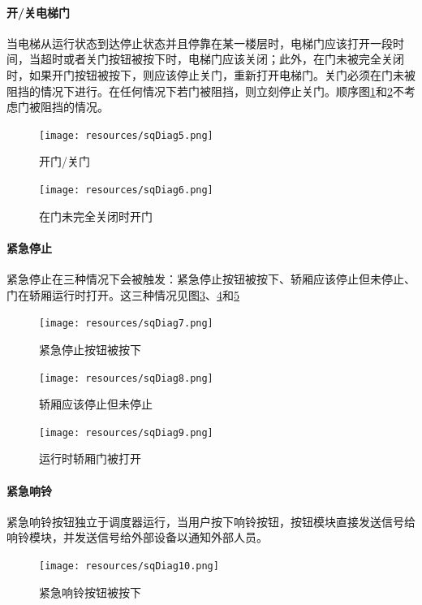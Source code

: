 \begin{minipage}{\textwidth}
\paragraph{开/关电梯门}
当电梯从运行状态到达停止状态并且停靠在某一楼层时，电梯门应该打开一段时间，当超时或者关门按钮被按下时，电梯门应该关闭；此外，在门未被完全关闭时，如果开门按钮被按下，则应该停止关门，重新打开电梯门。关门必须在门未被阻挡的情况下进行。在任何情况下若门被阻挡，则立刻停止关门。顺序图\ref{fig:sqDiag5}和\ref{fig:sqDiag6}不考虑门被阻挡的情况。
\begin{figure}[H]
	\centering
	\texttt{[image: resources/sqDiag5.png]}
	\caption{开门/关门}
	\label{fig:sqDiag5}
\end{figure}

\begin{figure}[H]
	\centering
	\texttt{[image: resources/sqDiag6.png]}
	\caption{在门未完全关闭时开门}
	\label{fig:sqDiag6}
\end{figure}
\end{minipage}

\begin{minipage}{\textwidth}
\paragraph{紧急停止}
紧急停止在三种情况下会被触发：紧急停止按钮被按下、轿厢应该停止但未停止、门在轿厢运行时打开。这三种情况见图\ref{fig:sqDiag7}、\ref{fig:sqDiag8}和\ref{fig:sqDiag9}

\begin{figure}[H]
	\centering
	\texttt{[image: resources/sqDiag7.png]}
	\caption{紧急停止按钮被按下}
	\label{fig:sqDiag7}
\end{figure}

\begin{figure}[H]
	\centering
	\texttt{[image: resources/sqDiag8.png]}
	\caption{轿厢应该停止但未停止}
	\label{fig:sqDiag8}
\end{figure}

\begin{figure}[H]
	\centering
	\texttt{[image: resources/sqDiag9.png]}
	\caption{运行时轿厢门被打开}
	\label{fig:sqDiag9}
\end{figure}
\end{minipage}

\begin{minipage}{\textwidth}
\paragraph{紧急响铃}
紧急响铃按钮独立于调度器运行，当用户按下响铃按钮，按钮模块直接发送信号给响铃模块，并发送信号给外部设备以通知外部人员。
\begin{figure}[H]
	\centering
	\texttt{[image: resources/sqDiag10.png]}
	\caption{紧急响铃按钮被按下}
	\label{fig:sqDiag10}
\end{figure}
\end{minipage}


